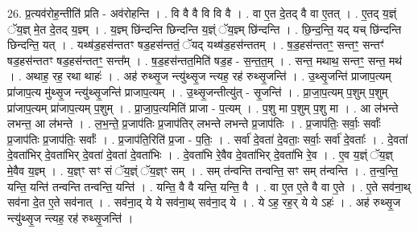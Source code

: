 \documentclass[17pt]{extarticle}
\begin{document}
26. प्र॒त्यव॑रोह॒न्तीति॑ प्रति - अव॑रोहन्ति । . वि वै वै वि वि वै । . वा ए॒त दे॒तद् वै वा ए॒तत् । . ए॒तद् य॒ज्ञ्ं ॅय॒ज्ञ् मे॒त दे॒तद् य॒ज्ञ्म् । . य॒ज्ञ्म् छि॑न्दन्ति छिन्दन्ति य॒ज्ञ्ं ॅय॒ज्ञ्म् छि॑न्दन्ति । . छि॒न्द॒न्ति॒ यद् यच् छि॑न्दन्ति छिन्दन्ति॒ यत् । . यथ्ष॑ड॒हस॑न्ततꣳ षड॒हस॑न्ततं॒ ॅयद् यथ्ष॑ड॒हस॑न्ततम् । . ष॒ड॒हस॑न्ततꣳ॒॒ सन्तꣳ॒॒ सन्तꣳ॑ षड॒हस॑न्ततꣳ षड॒हस॑न्ततꣳ॒॒ सन्त᳚म् । . ष॒ड॒हस॑न्तत॒मिति॑ षड॒ह - स॒न्त॒त॒म् । . सन्त॒ मथाथ॒ सन्तꣳ॒॒ सन्त॒ मथ॑ । . अथाह॒ रह॒ रथा थाहः॑ । . अह॑ रुथ्सृ॒ज न्त्यु॑थ्सृ॒ज न्त्यह॒ रह॑ रुथ्सृ॒जन्ति॑ । . उ॒थ्सृ॒जन्ति॑ प्राजाप॒त्यम् प्रा॑जाप॒त्य मु॑थ्सृ॒ज न्त्यु॑थ्सृ॒जन्ति॑ प्राजाप॒त्यम् । . उ॒थ्सृ॒जन्तीत्यु॑त् - सृ॒जन्ति॑ । . प्रा॒जा॒प॒त्यम् प॒शुम् प॒शुम् प्रा॑जाप॒त्यम् प्रा॑जाप॒त्यम् प॒शुम् । . प्रा॒जा॒प॒त्यमिति॑ प्राजा - प॒त्यम् । . प॒शु मा प॒शुम् प॒शु मा । . आ ल॑भन्ते लभन्त॒ आ ल॑भन्ते । . ल॒भ॒न्ते॒ प्र॒जाप॑तिः प्र॒जाप॑तिर् लभन्ते लभन्ते प्र॒जाप॑तिः । . प्र॒जाप॑तिः॒ सर्वाः॒ सर्वाः᳚ प्र॒जाप॑तिः प्र॒जाप॑तिः॒ सर्वाः᳚ । . प्र॒जाप॑ति॒रिति॑ प्र॒जा - प॒तिः॒ । . सर्वा॑ दे॒वता॑ दे॒वताः॒ सर्वाः॒ सर्वा॑ दे॒वताः᳚ । . दे॒वता॑ दे॒वता॑भिर् दे॒वता॑भिर् दे॒वता॑ दे॒वता॑ दे॒वता॑भिः । . दे॒वता॑भि रे॒वैव दे॒वता॑भिर् दे॒वता॑भि रे॒व । . ए॒व य॒ज्ञ्ं ॅय॒ज्ञ् मे॒वैव य॒ज्ञ्म् । . य॒ज्ञ्ꣳ सꣳ सं ॅय॒ज्ञ्ं ॅय॒ज्ञ्ꣳ सम् । . सम् त॑न्वन्ति तन्वन्ति॒ सꣳ सम् त॑न्वन्ति । . त॒न्व॒न्ति॒ यन्ति॒ यन्ति॑ तन्वन्ति तन्वन्ति॒ यन्ति॑ । . यन्ति॒ वै वै यन्ति॒ यन्ति॒ वै । . वा ए॒त ए॒ते वै वा ए॒ते । . ए॒ते सव॑ना॒थ् सव॑ना दे॒त ए॒ते सव॑नात् । . सव॑ना॒द् ये ये सव॑ना॒थ् सव॑ना॒द् ये । . ये ऽह॒ रह॒र् ये ये ऽहः॑ । . अह॑ रुथ्सृ॒ज न्त्यु॑थ्सृ॒ज न्त्यह॒ रह॑ रुथ्सृ॒जन्ति॑ । \newline
\end{document}
